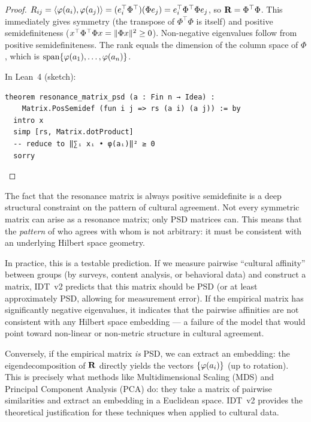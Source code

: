 \begin{proof}
$R_{ij} = \langle \varphi(a_i), \varphi(a_j) \rangle = (e_i^\top \Phi^\top)(\Phi e_j) =
e_i^\top \Phi^\top \Phi e_j$, so $\mathbf{R} = \Phi^\top \Phi$. This immediately
gives symmetry (the transpose of $\Phi^\top \Phi$ is itself) and positive
semidefiniteness ($x^\top \Phi^\top \Phi x = \lVert \Phi x \rVert^2 \geq 0$). Non-negative
eigenvalues follow from positive semidefiniteness. The rank equals the dimension
of the column space of $\Phi$, which is $\operatorname{span}\{\varphi(a_1),
\ldots, \varphi(a_n)\}$.

In Lean~4 (sketch):
\begin{lstlisting}
theorem resonance_matrix_psd (a : Fin n → Idea) :
    Matrix.PosSemidef (fun i j => rs (a i) (a j)) := by
  intro x
  simp [rs, Matrix.dotProduct]
  -- reduce to ‖∑ᵢ xᵢ • φ(aᵢ)‖² ≥ 0
  sorry
\end{lstlisting}
\end{proof}

\begin{interpretation}
\label{interp:psd}
The fact that the resonance matrix is always positive semidefinite is a
deep structural constraint on the pattern of cultural agreement. Not every
symmetric matrix can arise as a resonance matrix; only PSD matrices can. This
means that the \emph{pattern} of who agrees with whom is not arbitrary: it must
be consistent with an underlying Hilbert space geometry.

In practice, this is a testable prediction. If we measure pairwise ``cultural
affinity'' between groups (by surveys, content analysis, or behavioral data)
and construct a matrix, IDT~v2 predicts that this matrix should be PSD (or at
least approximately PSD, allowing for measurement error). If the empirical
matrix has significantly negative eigenvalues, it indicates that the pairwise
affinities are not consistent with any Hilbert space embedding --- a failure
of the model that would point toward non-linear or non-metric structure in
cultural agreement.

Conversely, if the empirical matrix \emph{is} PSD, we can extract an embedding:
the eigendecomposition of $\mathbf{R}$ directly yields the vectors
$\{\varphi(a_i)\}$ (up to rotation). This is precisely what methods like
Multidimensional Scaling (MDS) and Principal Component Analysis (PCA) do:
they take a matrix of pairwise similarities and extract an embedding in a
Euclidean space. IDT~v2 provides the theoretical justification for these
techniques when applied to cultural data.
\end{interpretation}


